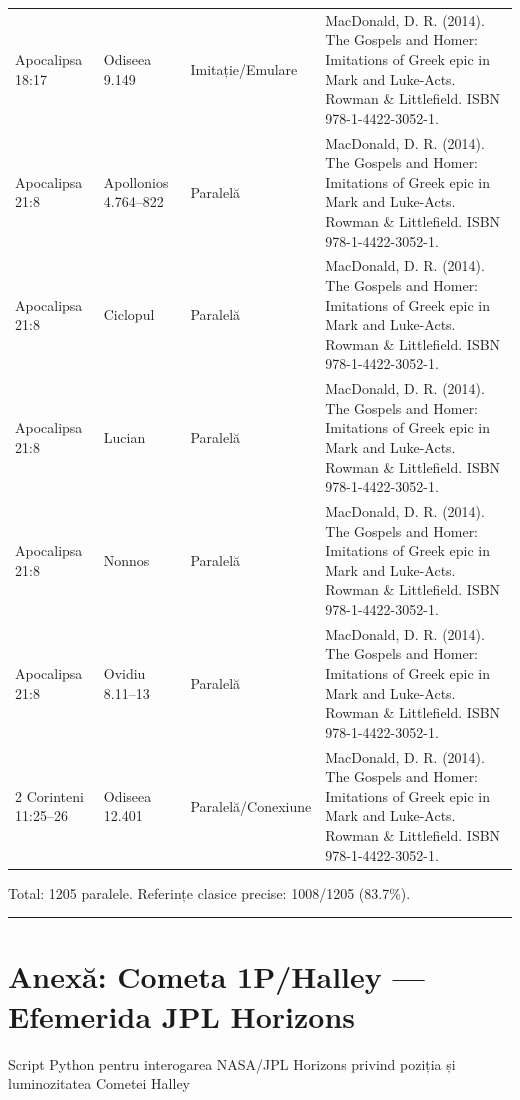 \documentclass[12pt,a4paper,twoside,openany]{book}
\begin{document}
\begin{longtable}{L{1.4cm}L{1.7cm}L{3.1cm}L{8.4cm}}
Apocalipsa 18:17 & Odiseea 9.149 & Imitație/Emulare & MacDonald, D. R. (2014). The Gospels and Homer: Imitations of Greek epic in Mark and Luke-Acts. Rowman \& Littlefield. ISBN 978-1-4422-3052-1. \\
Apocalipsa 21:8 & Apollonios 4.764–822 & Paralelă & MacDonald, D. R. (2014). The Gospels and Homer: Imitations of Greek epic in Mark and Luke-Acts. Rowman \& Littlefield. ISBN 978-1-4422-3052-1. \\
Apocalipsa 21:8 & Ciclopul & Paralelă & MacDonald, D. R. (2014). The Gospels and Homer: Imitations of Greek epic in Mark and Luke-Acts. Rowman \& Littlefield. ISBN 978-1-4422-3052-1. \\
Apocalipsa 21:8 & Lucian & Paralelă & MacDonald, D. R. (2014). The Gospels and Homer: Imitations of Greek epic in Mark and Luke-Acts. Rowman \& Littlefield. ISBN 978-1-4422-3052-1. \\
Apocalipsa 21:8 & Nonnos & Paralelă & MacDonald, D. R. (2014). The Gospels and Homer: Imitations of Greek epic in Mark and Luke-Acts. Rowman \& Littlefield. ISBN 978-1-4422-3052-1. \\
Apocalipsa 21:8 & Ovidiu 8.11–13 & Paralelă & MacDonald, D. R. (2014). The Gospels and Homer: Imitations of Greek epic in Mark and Luke-Acts. Rowman \& Littlefield. ISBN 978-1-4422-3052-1. \\
2 Corinteni 11:25–26 & Odiseea 12.401 & Paralelă/Conexiune & MacDonald, D. R. (2014). The Gospels and Homer: Imitations of Greek epic in Mark and Luke-Acts. Rowman \& Littlefield. ISBN 978-1-4422-3052-1. \\
\bottomrule
\end{longtable}
\normalsize
Total: 1205 paralele. Referințe clasice precise: 1008/1205 (83.7\%).


\bigskip\noindent\textcolor{darkred}{\rule{\textwidth}{2pt}}\bigskip

\chapter{Anexă: Cometa 1P/Halley — Efemerida JPL Horizons}\label{halley}
Script Python pentru interogarea NASA/JPL Horizons privind poziția și luminozitatea Cometei Halley
\end{document}
